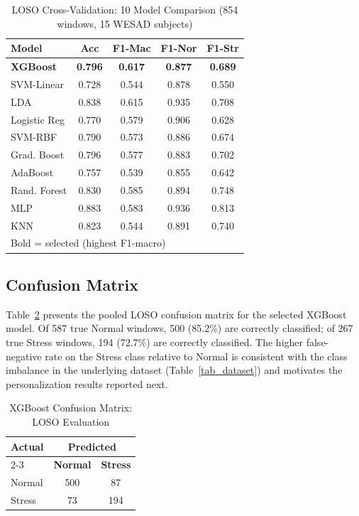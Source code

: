 \documentclass[conference]{IEEEtran}
\begin{document}
\begin{table}[htbp]
\caption{LOSO Cross-Validation:
10 Model Comparison
(854 windows, 15 WESAD subjects)}
\begin{center}
\begin{tabular}{|l|c|c|c|c|}
\hline
\textbf{Model} &
\textbf{Acc} &
\textbf{F1-Mac} &
\textbf{F1-Nor} &
\textbf{F1-Str} \\
\hline
\textbf{XGBoost} &
\textbf{0.796} &
\textbf{0.617} &
\textbf{0.877} &
\textbf{0.689} \\
SVM-Linear & 0.728 & 0.544 & 0.878 & 0.550 \\
LDA & 0.838 & 0.615 & 0.935 & 0.708 \\
Logistic Reg & 0.770 & 0.579 & 0.906 & 0.628 \\
SVM-RBF & 0.790 & 0.573 & 0.886 & 0.674 \\
Grad. Boost & 0.796 & 0.577 & 0.883 & 0.702 \\
AdaBoost & 0.757 & 0.539 & 0.855 & 0.642 \\
Rand. Forest & 0.830 & 0.585 & 0.894 & 0.748 \\
MLP & 0.883 & 0.583 & 0.936 & 0.813 \\
KNN & 0.823 & 0.544 & 0.891 & 0.740 \\
\hline
\multicolumn{5}{l}{Bold = selected (highest F1-macro)} \\
\end{tabular}
\label{tab_models}
\end{center}
\end{table}

\subsection{Confusion Matrix}
Table~\ref{tab_cm} presents the pooled LOSO confusion matrix
for the selected XGBoost model. Of 587 true Normal windows,
500 (85.2\%) are correctly classified; of 267 true Stress
windows, 194 (72.7\%) are correctly classified. The higher
false-negative rate on the Stress class relative to Normal is
consistent with the class imbalance in the underlying dataset
(Table~\ref{tab_dataset}) and motivates the personalization
results reported next.

\begin{table}[htbp]
\caption{XGBoost Confusion Matrix:
LOSO Evaluation}
\begin{center}
\begin{tabular}{|l|c|c|}
\hline
\multirow{2}{*}{\textbf{Actual}} &
\multicolumn{2}{c|}{\textbf{Predicted}} \\
\cline{2-3}
& \textbf{Normal} &
\textbf{Stress} \\
\hline
Normal & 500 & 87 \\
Stress & 73 & 194 \\
\hline
\end{tabular}
\label{tab_cm}
\end{center}
\end{table}
\end{document}
